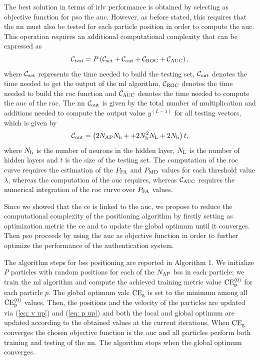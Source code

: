 \documentclass[conference]{IEEEtran}
\begin{document}
The best solution in terms of \ac{irlv} performance is obtained by selecting as objective function for \ac{pso} the \ac{auc}. However, as before stated, this requires that the \ac{nn} must also be tested for each particle position in order to compute the \ac{auc}. This operation requires an additional computational complexity that can be expressed as
\begin{equation}
    \mathcal{C}_{\rm test} = P\left(\mathcal{C}_{\rm set} + \mathcal{C}_{\rm out}+\mathcal{C}_{\rm ROC}+\mathcal{C}_{\rm AUC}\right),
\end{equation}
where $\mathcal{C}_{\rm set}$ represents the time needed to build the testing set, $\mathcal{C}_{\rm out}$ denotes the time needed to get the output of the \ac{ml} algorithm, $\mathcal{C}_{\rm ROC}$ denotes the time needed to build the \ac{roc} function and $\mathcal{C}_{\rm AUC}$ denotes the time needed to compute the \ac{auc} of the \ac{roc}.
The \ac{nn} $\mathcal{C}_{\rm out}$ is given by the total number of multiplication and additions needed to compute the output value $y^{(L-1)}$ for all testing vectors, which is given by
\begin{equation}
    \mathcal{C}_{\rm out} = \left(2N_{\rm AP}N_{\rm h}++2N_{\rm h}^2N_{\rm L} + 2N_{\rm h}\right)t,
\end{equation}
where $N_{\rm h}$ is the number of neurons in the hidden layer, $N_{\rm L}$ is the number of hidden layers and $t$ is the size of the testing set.
The computation of the \ac{roc} curve requires the estimation of the $P_{\rm FA}$ and $P_{\rm MD}$ values for each threshold value $\lambda$, whereas the computation of the \ac{auc} requires, whereas $\mathcal{C}_{\rm AUC}$ requires the numerical integration of the \ac{roc} curve over $P_{\rm FA}$ values.

Since we showed that the \ac{ce} is linked to the \ac{auc}, we propose to reduce the computational complexity of the positioning algorithm by firstly setting as optimization metric the \ac{ce} and to update the global optimum until it converges. Then \ac{pso} proceeds by using the \ac{auc} as objective function in order to further optimize the performance of the authentication system.

The algorithm steps for \acp{bs} positioning are reported in Algorithm 1. We initialize $P$ particles with random positions for each of the $N_{\rm AP}$ \acp{bs} in each particle; we train the \ac{ml} algorithm and compute the achieved training metric value $\rm{CE}_p^{(0)}$ for each particle $p$. The global optimum vale $\rm{CE}_g$ is set to the minimum among all $\rm{CE}_p^{(0)}$ values. Then, the positions and the velocity of the particles are updated via (\ref{eq: v up}) and (\ref{eq: p up}) and both the local and global optimum are updated according to the obtained values at the current iterations. When $\rm{CE}_g$ converges the chosen objective function is the \ac{auc} and all particles perform both training and testing of the \ac{nn}. The algorithm stops when the global optimum converges.
\end{document}
